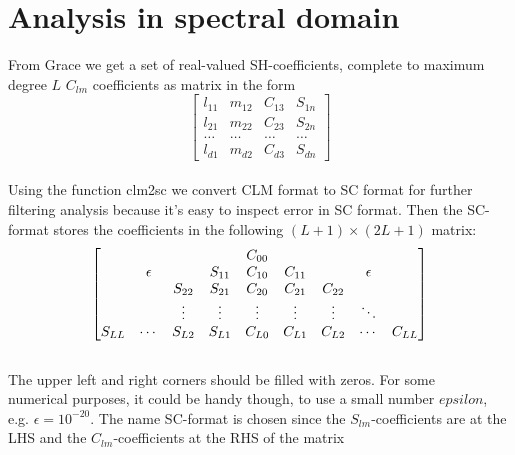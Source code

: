 \documentclass[a4paper,12pt]{report}
\begin{document}
\chapter{Analysis in spectral domain}
From Grace we get a set of real-valued SH-coefficients, complete to maximum degree $L$
$C_{lm}$ coefficients as matrix in the form\\
\[
\begin{bmatrix}
    l_{11}       & m_{12} & C_{13} & S_{1n} \\
    l_{21}       & m_{22} & C_{23} & S_{2n} \\
    \ldots & \ldots & \ldots & \ldots \\
    l_{d1}       & m_{d2} & C_{d3} & S_{dn}
\end{bmatrix}
\]\\
Using the function clm2sc we convert CLM format to SC format for further filtering analysis because it's easy to inspect error in SC format.
Then the SC-format stores the coefficients in the following $(L + 1)\times (2L + 1)$ matrix:\\

\[
\centering%
\begin{bmatrix}%
      &         &         &         & C_{00}   &         &         &             & \\
      & \epsilon&         & S_{11}  & C_{10}   &C_{11}   &         & \epsilon    & \\
      &         & S_{22}  & S_{21}  & C_{20}   & C_{21}  & C_{22}  &             & \\
      &         &\vdots{} &\vdots{} & \vdots{} &\vdots{} &\vdots{} &\ddots       & \\
      S_{LL}    &\cdots   & S_{L2}  & S_{L1}   & C_{L0}  & C_{L1}  & C_{L2}      &\cdots &C_{LL}
\end{bmatrix}%
\]\\
The upper left and right corners should be filled with zeros. For some \\ numerical purposes,
it could be handy though, to use a small number $epsilon$, e.g. $\epsilon = 10^{-20}$.
The name SC-format is chosen since the $S_{lm}$-coefficients are at the LHS and the $C_{lm}$-coefficients at the RHS of the matrix\\
\end{document}
